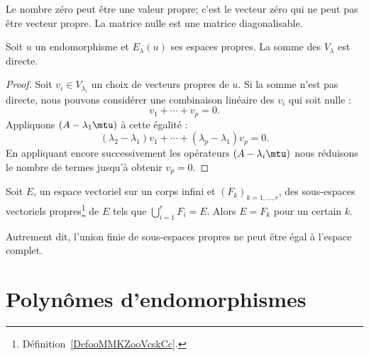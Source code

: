 \begin{remark}
    Le nombre zéro peut être une valeur propre; c'est le vecteur zéro qui ne peut pas être vecteur propre. La matrice nulle est une matrice diagonalisable.
\end{remark}

\begin{lemma}       \label{LemjcztYH}
    Soit \( u\) un endomorphisme et \( E_{\lambda}(u)\) ses espaces propres. La somme des \( V_{\lambda}\) est directe.
\end{lemma}

\begin{proof}
    Soit \( v_i\in V_{\lambda_i}\) un choix de vecteurs propres de \( u\). Si la somme n'est pas directe, nous pouvons considérer une combinaison linéaire des \( v_i\) qui soit nulle :
    \begin{equation}
        v_1+\cdots+v_p=0.
    \end{equation}
    Appliquons \( (A-\lambda_1\mtu)\) à cette égalité :
    \begin{equation}
        (\lambda_2-\lambda_1)v_1+\cdots+(\lambda_p-\lambda_1)v_p=0.
    \end{equation}
    En appliquant encore successivement les opérateurs \( (A-\lambda_i\mtu)\) nous réduisons le nombre de termes jusqu'à obtenir \( v_p=0\).
\end{proof}

\begin{proposition}   \label{PropTVKbxU}
    Soit \( E\), un espace vectoriel sur un corps infini et \( (F_k)_{k=1,\ldots, r}\), des sous-espaces vectoriels propres\footnote{Définition~\ref{DefooMMKZooVcskCc}.} de \( E\) tels que \( \bigcup_{i=1}^rF_i=E\). Alors \( E=F_k\) pour un certain \( k\).

    Autrement dit, l'union finie de sous-espaces propres ne peut être égal à l'espace complet.
\end{proposition}

\section{Polynômes d'endomorphismes}
\label{SECooUEQVooLBrRiE}

